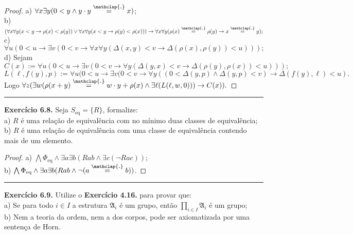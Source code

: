 \documentclass[11pt]{article}
\theoremstyle{definition}
\newcommand{\mf}[1]{\mathfrak{#1}}
\newcommand\overtext[2]{\stackrel{\mathclap{\normalfont\mbox{#1}}}{#2}}
\begin{document}
\begin{proof}
    a) $\forall x\exists y(0<y\wedge y\cdot y\overtext{.}{=}x)$;\\
    b) $(\forall x\forall y(x<y\rightarrow\rho(x)<\rho(y))\vee\forall x\forall y(x<y\rightarrow\rho(y)<\rho(x)))\rightarrow\forall x\forall y(\rho(x)\overtext{.}{=}\rho(y)\rightarrow x\overtext{.}{=}y);$\\
    c) $\forall u(0<u\rightarrow\exists v(0<v\rightarrow\forall x\forall y(\Delta(x,y)<v\rightarrow\Delta(\rho(x),\rho(y))<u)));$\\
    d) Sejam $$C(x):=\forall u(0<u\rightarrow\exists v(0<v\rightarrow\forall y(\Delta(y,x)<v\rightarrow\Delta(\rho(y),\rho(x))<u)));$$
    $$L(\ell, f(y), p):=\forall u(0<u\rightarrow\exists v(0<v\rightarrow\forall y((0<\Delta(y,p)\wedge\Delta(y,p)<v)\rightarrow\Delta(f(y),\ell)<u).$$
    Logo $\forall z(\exists w(\rho(x+y)\overtext{.}{=}w\cdot y+\rho(x)\wedge\exists\ell(L(\ell,w,0)))\rightarrow C(x)).$
\end{proof}

\hrule

\textbf{Exercício 6.8.} Seja $S_\text{eq}=\{R\}$, formalize:\\
a) $R$ é uma relação de equivalência com no mínimo duas classes de equivalência;\\
b) $R$ é uma relação de equivalência com uma classe de equivalência contendo mais de um elemento.

\begin{proof}
    a) $\bigwedge\Phi_\text{eq}\wedge\exists a\exists b(Rab\wedge\exists c(\neg Rac))$;\\
    b) $\bigwedge\Phi_\text{eq}\wedge\exists a\exists b(Rab\wedge\neg(a\overtext{.}{=}b))$.
\end{proof}

\hrule

\textbf{Exercício 6.9.} Utilize o \textbf{Exercício 4.16.} para provar que:\\
a) Se para todo $i\in I$ a estrutura $\mf{A}_i$ é um grupo, então $\prod_{i\in I}\mf{A}_i$ é um grupo;\\
b) Nem a teoria da ordem, nem a dos corpos, pode ser axiomatizada por uma sentença de Horn.
\end{document}
